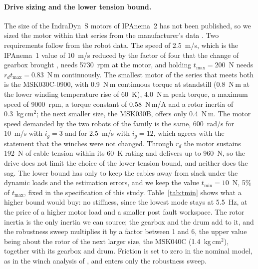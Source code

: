 \documentclass[10pt]{article}
\begin{document}
\paragraph{Drive sizing and the lower tension bound.} The size of the IndraDyn~S motors of IPAnema~2 has not been published, so we sized the motor within that series from the manufacturer's data \citep{rexroth_msk2018}. Two requirements follow from the robot data. The speed of 2.5~m/s, which is the IPAnema~1 value of 10~m/s reduced by the factor of four that the change of gearbox brought \citep{pott2013ipanema}, needs 5730~rpm at the motor, and holding $t_{\max}=200$~N needs $r_d t_{\max}=0.83$~N\,m continuously. The smallest motor of the series that meets both is the MSK030C-0900, with 0.9~N\,m continuous torque at standstill (0.8~N\,m at the lower winding temperature rise of 60~K), 4.0~N\,m peak torque, a maximum speed of 9000~rpm, a torque constant of 0.58~N\,m/A and a rotor inertia of 0.3~kg\,cm$^2$; the next smaller size, the MSK030B, offers only 0.4~N\,m. The motor speed demanded by the two robots of the family is the same, 600~rad/s for 10~m/s with $i_g=3$ and for 2.5~m/s with $i_g=12$, which agrees with the statement that the winches were not changed. Through $r_d$ the motor sustains 192~N of cable tension within its 60~K rating and delivers up to 960~N, so the drive does not limit the choice of the lower tension bound, and neither does the sag. The lower bound has only to keep the cables away from slack under the dynamic loads and the estimation errors, and we keep the value $t_{\min}=10$~N, 5\% of $t_{\max}$, fixed in the specification of this study. Table~\ref{tab:tmin} shows what a higher bound would buy: no stiffness, since the lowest mode stays at 5.5~Hz, at the price of a higher motor load and a smaller post fault workspace. The rotor inertia is the only inertia we can source; the gearbox and the drum add to it, and the robustness sweep multiplies it by a factor between 1 and 6, the upper value being about the rotor of the next larger size, the MSK040C (1.4~kg\,cm$^2$), together with its gearbox and drum. Friction is set to zero in the nominal model, as in the winch analysis of \citep{ida2022actuators}, and enters only the robustness sweep.
\end{document}
